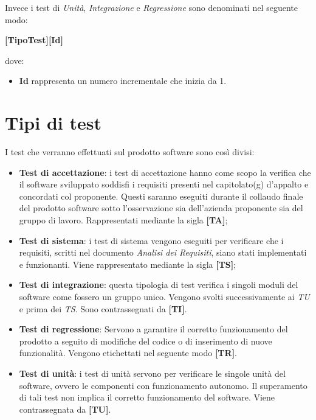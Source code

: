 Invece i test di \textit{Unità}, \textit{Integrazione} e \textit{Regressione} sono denominati nel seguente modo:
\begin{center}
	\textbf{[TipoTest][Id]}
\end{center}
dove:
\begin{itemize}
	\item \textbf{Id} rappresenta un numero incrementale che inizia da 1.
\end{itemize}

\section{Tipi di test} \label{4.1}
I test che verranno effettuati sul prodotto software sono così divisi:
\begin{itemize}
	\item \textbf{Test di accettazione}: i test di accettazione hanno come scopo la verifica che il software sviluppato soddisfi i requisiti presenti nel capitolato(g) d’appalto e concordati col proponente.
	Questi saranno eseguiti durante il collaudo finale del prodotto software sotto l'osservazione sia dell'azienda proponente sia del gruppo di lavoro.
	Rappresentati mediante la sigla \textbf{[TA]};
	
	\item \textbf{Test di sistema}: i test di sistema vengono eseguiti per verificare che i requisiti, scritti nel documento \textit{Analisi dei Requisiti}, siano stati implementati e funzionanti.
	Viene rappresentato mediante la sigla \textbf{[TS]};
		
	\item \textbf{Test di integrazione}: questa tipologia di test verifica i singoli moduli del software come fossero un gruppo unico.
	Vengono svolti successivamente ai \textit{TU} e prima dei \textit{TS}.
	Sono contrassegnati da \textbf{[TI]}.
	
	\item \textbf{Test di regressione}: Servono a garantire il corretto funzionamento del prodotto a seguito di modifiche del codice o di inserimento di nuove funzionalità.
	Vengono etichettati nel seguente modo \textbf{[TR]}.
	
	\item \textbf{Test di unità}: i test di unità servono per verificare le singole unità del software, ovvero le componenti con funzionamento autonomo.
	Il superamento di tali test non implica il corretto funzionamento del software.
	Viene contrassegnata da \textbf{[TU]}.
\end{itemize}



